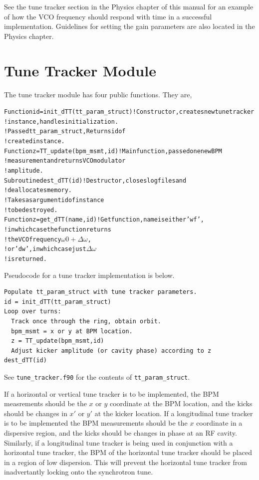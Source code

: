 See the tune tracker section in the Physics chapter of this manual for
an example of how the VCO frequency should respond with time in a
successful implementation.  Guidelines for setting the gain parameters
are also located in the Physics chapter.

\section{Tune Tracker Module}
The tune tracker module has four public functions.  They are,
\begin{alltt}
Function id = init_dTT(tt_param_struct)     !Constructor, creates new tune tracker 
                                            !instance, handles initialization.
                                            !Passed tt_param_struct, Returns id of 
                                            !created instance.
Function z = TT_update(bpm_msmt,id)         !Main function, passed one new BPM 
                                            !measurement and returns VCO modulator 
                                            !amplitude.
Subroutine dest_dTT(id)                     !Destructor, closes log files and 
                                            !deallocates memory.
                                            !Takes as argument id of instance 
                                            !to be destroyed.
Function z = get_dTT(name,id)               !Get function, name is either 'wf', 
                                            !in which case the function returns 
                                            !the VCO frequency \(\omega0+\Delta\omega\), 
                                            !or 'dw', in which case just \(\Delta\omega\)
                                            !is returned.
\end{alltt}

Pseudocode for a tune tracker implementation is below.
\begin{verbatim}
Populate tt_param_struct with tune tracker parameters.
id = init_dTT(tt_param_struct)
Loop over turns:
  Track once through the ring, obtain orbit.
  bpm_msmt = x or y at BPM location.
  z = TT_update(bpm_msmt,id)
  Adjust kicker amplitude (or cavity phase) according to z
dest_dTT(id)
\end{verbatim}

See {\tt tune\_tracker.f90} for the contents of {\tt tt\_param\_struct}.

If a horizontal or vertical tune tracker is to be implemented, the BPM
measrements should be the $x$ or $y$ coordinate at the BPM location,
and the kicks should be changes in $x'$ or $y'$ at the kicker
location.  If a longitudinal tune tracker is to be implemented the BPM
measurements should be the $x$ coordinate in a dispersive region, and
the kicks should be changes in phase at an RF cavity.  Similarly, if a
longitudinal tune tracker is being used in conjunction with a
horizontal tune tracker, the BPM of the horizontal tune tracker should
be placed in a region of low dispersion.  This will prevent the
horizontal tune tracker from inadvertantly locking onto the
synchrotron tune.

